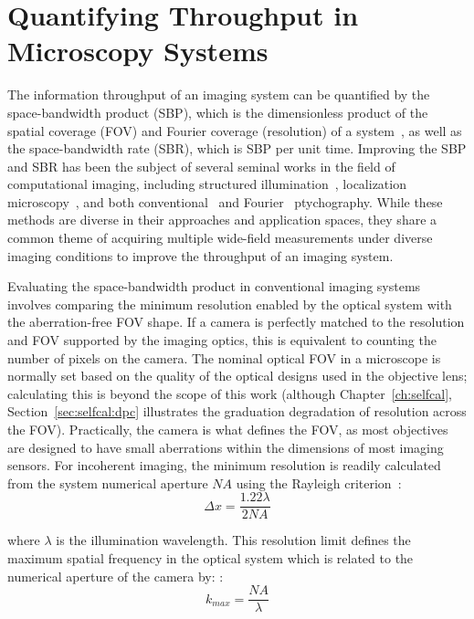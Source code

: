 \section{Quantifying Throughput in Microscopy Systems}
The information throughput of an imaging system can be quantified by the space-bandwidth product (SBP), which is the dimensionless product of the spatial coverage (FOV) and Fourier coverage (resolution) of a system~\cite{Lohmann1996space}, as well as the space-bandwidth rate (SBR), which is SBP per unit time. Improving the SBP and SBR has been the subject of several seminal works in the field of computational imaging, including structured illumination~\cite{gustafsson2000surpassing}, localization microscopy~\cite{Rust:06, betzig2006imaging}, and both conventional~\cite{rodenburg2004phase} and Fourier~\cite{Zheng2013,tian2015computational,Tian2014} ptychography. While these methods are diverse in their approaches and application spaces, they share a common theme of acquiring multiple wide-field measurements under diverse imaging conditions to improve the throughput of an imaging system.

Evaluating the space-bandwidth product in conventional imaging systems involves comparing the minimum resolution enabled by the optical system with the aberration-free FOV shape. If a camera is perfectly matched to the resolution and FOV supported by the imaging optics, this is equivalent to counting the number of pixels on the camera. The nominal optical FOV in a microscope is normally set based on the quality of the optical designs used in the objective lens; calculating this is beyond the scope of this work (although Chapter~\ref{ch:selfcal}, Section~\ref{sec:selfcal:dpc} illustrates the graduation degradation of resolution across the FOV). Practically, the camera is what defines the FOV, as most objectives are designed to have small aberrations within the dimensions of most imaging sensors. For incoherent imaging, the minimum resolution is readily calculated from the system numerical aperture $NA$ using the Rayleigh criterion~\cite{rayleigh1896xv}:
\begin{equation}\label{eq:highthtoughput_rayleigh}
    \Delta x = \frac{1.22 \lambda}{2NA}
\end{equation}

\noindent where $\lambda$ is the illumination wavelength. This resolution limit defines the maximum spatial frequency in the optical system which is related to the numerical aperture of the camera by:
:
\begin{equation}
    k_{max} = \frac{NA}{\lambda}
\end{equation}

